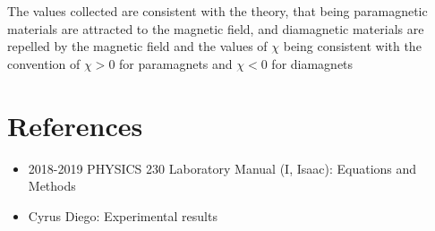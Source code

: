 \documentclass[12pt]{article}
\begin{document}
The values collected are consistent with the theory, that being paramagnetic materials are attracted to the magnetic field, and diamagnetic materials are repelled by the magnetic field and the values of $\chi$ being consistent with the convention of $\chi>0$ for paramagnets and $\chi<0$ for diamagnets

\pagebreak

\section*{References}
\begin{itemize}
    \item 2018-2019 PHYSICS 230 Laboratory Manual (I, Isaac): Equations and Methods
    \item Cyrus Diego: Experimental results
\end{itemize}
\pagebreak
\end{document}
